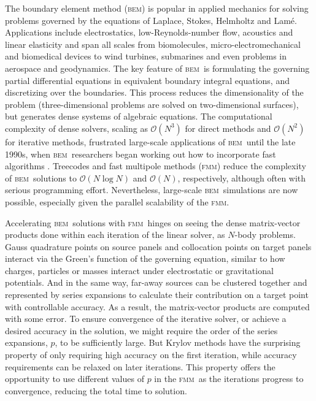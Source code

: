 \documentclass[final,leqno,]{siamltex1213}
\newcommand{\bem}{\textsc{bem}\xspace}
\newcommand{\fmm}{\textsc{fmm}\xspace}
\renewcommand{\O}[1]{\mathcal{O}(#1)}
\begin{document}
The boundary element method (\bem) is popular in applied mechanics for solving problems governed by the equations of Laplace, Stokes, Helmholtz and Lam{\'e}. Applications include electrostatics, low-Reynolds-number flow, acoustics and linear elasticity and span all scales from biomolecules, micro-electromechanical and biomedical devices to wind turbines, submarines and even problems in aerospace and geodynamics. The key feature of \bem\ is formulating the governing partial differential equations in equivalent boundary integral equations, and discretizing over the boundaries. This process reduces the dimensionality of the problem (three-dimensional problems are solved on two-dimensional surfaces), but generates dense systems of algebraic equations. 
The computational complexity of dense solvers, scaling as $\O{N^3}$ for direct methods and $\O{N^2}$ for iterative methods, frustrated large-scale applications of \bem\ until the late 1990s, when \bem\ researchers began working out how to incorporate fast algorithms 
\cite{Liu2006}. Treecodes and fast multipole methods (\fmm) reduce the complexity of \bem\ solutions to $\O{N \log N}$ and $\O{N}$, respectively, although often with serious programming effort. Nevertheless, large-scale \bem\ simulations are now possible, especially given the parallel scalability of the \fmm \cite{YokotaETal2011a,YokotaBarba2011a}.

Accelerating \bem\ solutions with \fmm\ hinges on seeing the dense matrix-vector products done within each iteration of the linear solver, as $N$-body problems. Gauss quadrature points on source panels and collocation points on target panels interact via the Green's function of the governing equation, similar to how charges, particles or masses interact under electrostatic or gravitational potentials. And in the same way, far-away sources can be clustered together and represented by series expansions to calculate their contribution on a target point with controllable accuracy. As a result, the matrix-vector products are computed with some error. To ensure convergence of the iterative solver, or achieve a desired accuracy in the solution, we might require the order of the series expansions, $p$, to be sufficiently large. But Krylov methods have the surprising property of only requiring high accuracy on the first iteration, while accuracy requirements can be relaxed on later iterations. This property offers the opportunity to use different values of $p$ in the \fmm\ as the iterations progress to convergence, reducing the total time to solution.
\end{document}
